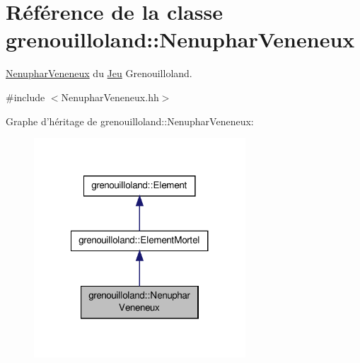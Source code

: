 \hypertarget{classgrenouilloland_1_1NenupharVeneneux}{\section{Référence de la classe grenouilloland\-:\-:Nenuphar\-Veneneux}
\label{classgrenouilloland_1_1NenupharVeneneux}
}


\hyperlink{classgrenouilloland_1_1NenupharVeneneux}{Nenuphar\-Veneneux} du \hyperlink{classgrenouilloland_1_1Jeu}{Jeu} Grenouilloland.  




{\ttfamily \#include $<$Nenuphar\-Veneneux.\-hh$>$}



Graphe d'héritage de grenouilloland\-:\-:Nenuphar\-Veneneux\-:
\nopagebreak
\begin{figure}[H]
\begin{center}
\leavevmode
\includegraphics[width=224pt]{classgrenouilloland_1_1NenupharVeneneux__inherit__graph}
\end{center}
\end{figure}


